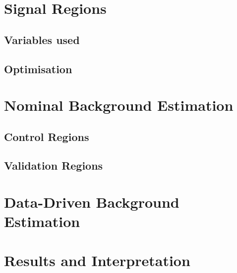 	\section{Signal Regions}
	\label{sec:SRs}

		\subsection{Variables used}

		\subsection{Optimisation}


	\section{Nominal Background Estimation}
	\label{sec:bkgest}

		\subsection{Control Regions}

		\subsection{Validation Regions}


	\section{Data-Driven Background Estimation}
	\label{sec:ddbkgest}


	\section{Results and Interpretation}
	\label{sec:results}








